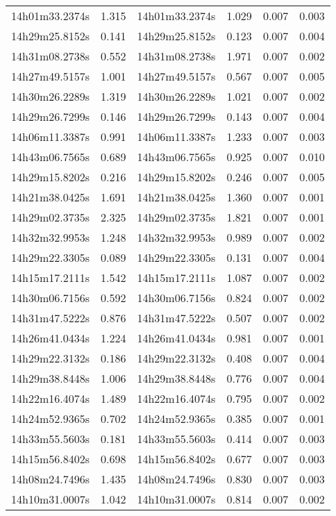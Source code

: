 \begin{table}
\begin{tabular}{cccccc}
14h01m33.2374s & 1.315 & 14h01m33.2374s & 1.029 & 0.007 & 0.003 \\
14h29m25.8152s & 0.141 & 14h29m25.8152s & 0.123 & 0.007 & 0.004 \\
14h31m08.2738s & 0.552 & 14h31m08.2738s & 1.971 & 0.007 & 0.002 \\
14h27m49.5157s & 1.001 & 14h27m49.5157s & 0.567 & 0.007 & 0.005 \\
14h30m26.2289s & 1.319 & 14h30m26.2289s & 1.021 & 0.007 & 0.002 \\
14h29m26.7299s & 0.146 & 14h29m26.7299s & 0.143 & 0.007 & 0.004 \\
14h06m11.3387s & 0.991 & 14h06m11.3387s & 1.233 & 0.007 & 0.003 \\
14h43m06.7565s & 0.689 & 14h43m06.7565s & 0.925 & 0.007 & 0.010 \\
14h29m15.8202s & 0.216 & 14h29m15.8202s & 0.246 & 0.007 & 0.005 \\
14h21m38.0425s & 1.691 & 14h21m38.0425s & 1.360 & 0.007 & 0.001 \\
14h29m02.3735s & 2.325 & 14h29m02.3735s & 1.821 & 0.007 & 0.001 \\
14h32m32.9953s & 1.248 & 14h32m32.9953s & 0.989 & 0.007 & 0.002 \\
14h29m22.3305s & 0.089 & 14h29m22.3305s & 0.131 & 0.007 & 0.004 \\
14h15m17.2111s & 1.542 & 14h15m17.2111s & 1.087 & 0.007 & 0.002 \\
14h30m06.7156s & 0.592 & 14h30m06.7156s & 0.824 & 0.007 & 0.002 \\
14h31m47.5222s & 0.876 & 14h31m47.5222s & 0.507 & 0.007 & 0.002 \\
14h26m41.0434s & 1.224 & 14h26m41.0434s & 0.981 & 0.007 & 0.001 \\
14h29m22.3132s & 0.186 & 14h29m22.3132s & 0.408 & 0.007 & 0.004 \\
14h29m38.8448s & 1.006 & 14h29m38.8448s & 0.776 & 0.007 & 0.004 \\
14h22m16.4074s & 1.489 & 14h22m16.4074s & 0.795 & 0.007 & 0.002 \\
14h24m52.9365s & 0.702 & 14h24m52.9365s & 0.385 & 0.007 & 0.001 \\
14h33m55.5603s & 0.181 & 14h33m55.5603s & 0.414 & 0.007 & 0.003 \\
14h15m56.8402s & 0.698 & 14h15m56.8402s & 0.677 & 0.007 & 0.003 \\
14h08m24.7496s & 1.435 & 14h08m24.7496s & 0.830 & 0.007 & 0.003 \\
14h10m31.0007s & 1.042 & 14h10m31.0007s & 0.814 & 0.007 & 0.002 \\

\end{tabular}
\end{table}
